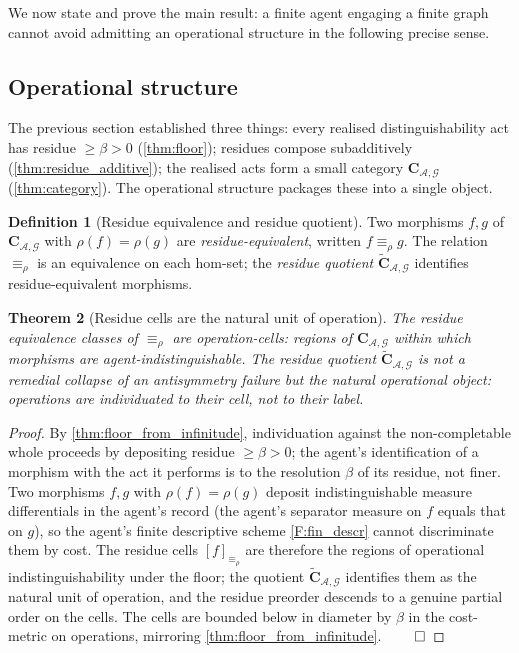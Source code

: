 \documentclass[11pt,twocolumn,a4paper]{article}
\theoremstyle{thmstyle}
\newtheorem{theorem}{Theorem}[section]
\theoremstyle{definition}
\newtheorem{definition}[theorem]{Definition}
\theoremstyle{remark}
\newcommand{\Graph}{\mathcal{G}}
\newcommand{\Agent}{\mathcal{A}}
\newcommand{\Res}{\rho}
\newcommand{\floor}{\beta}
\begin{document}
We now state and prove the main result: a finite agent engaging a
finite graph cannot avoid admitting an operational structure in the
following precise sense.

\subsection{Operational structure}

The previous section established three things: every realised
distinguishability act has residue $\geq \floor > 0$
(\cref{thm:floor}); residues compose subadditively
(\cref{thm:residue_additive}); the realised acts form a small
category $\mathbf{C}_{\Agent,\Graph}$ (\cref{thm:category}). The
operational structure packages these into a single object.

\begin{definition}[Residue equivalence and residue quotient]
\label{def:residue_equiv}
Two morphisms $f, g$ of $\mathbf{C}_{\Agent,\Graph}$ with
$\Res(f) = \Res(g)$ are \emph{residue-equivalent}, written
$f \equiv_\Res g$. The relation $\equiv_\Res$ is an equivalence on
each hom-set; the \emph{residue quotient}
$\widetilde{\mathbf{C}}_{\Agent,\Graph}$ identifies
residue-equivalent morphisms.
\end{definition}

\begin{theorem}[Residue cells are the natural unit of operation]
\label{thm:residue_cells}
The residue equivalence classes of $\equiv_\Res$ are
\emph{operation-cells}: regions of $\mathbf{C}_{\Agent,\Graph}$
within which morphisms are agent-indistinguishable. The residue
quotient $\widetilde{\mathbf{C}}_{\Agent,\Graph}$ is not a
remedial collapse of an antisymmetry failure but the natural
operational object: operations are individuated to their cell, not
to their label.
\end{theorem}

\begin{proof}
By \cref{thm:floor_from_infinitude}, individuation against the
non-completable whole proceeds by depositing residue
$\geq \floor > 0$; the agent's identification of a morphism with the
act it performs is to the resolution $\floor$ of its residue, not
finer. Two morphisms $f, g$ with $\Res(f) = \Res(g)$ deposit
indistinguishable measure differentials in the agent's record (the
agent's separator measure on $f$ equals that on $g$), so the
agent's finite descriptive scheme \ref{F:fin_descr} cannot
discriminate them by cost. The residue cells $[f]_{\equiv_\Res}$
are therefore the regions of operational indistinguishability under
the floor; the quotient
$\widetilde{\mathbf{C}}_{\Agent,\Graph}$ identifies them as the
natural unit of operation, and the residue preorder descends to a
genuine partial order on the cells. The cells are bounded below in
diameter by $\floor$ in the cost-metric on operations, mirroring
\cref{thm:floor_from_infinitude}. $\qed$
\end{proof}
\end{document}
